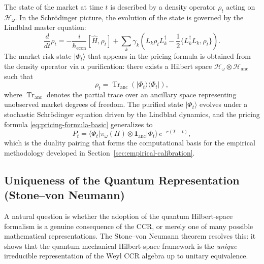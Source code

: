 The state of the market at time $t$ is described by a density operator $\rho_t$
acting on $\mathcal{H}_\omega$. In the Schr\"odinger picture, the evolution of the
state is governed by the Lindblad master equation:
\begin{equation}\label{eq:lindblad}
    \frac{d}{dt} \rho_t = -\frac{i}{\hbar_{\mathrm{econ}}} [\hat{H}, \rho_t]
    + \sum_k \gamma_k
    \left( L_k \rho_t L_k^\dagger - \frac{1}{2} \{L_k^\dagger L_k, \rho_t\} \right).
\end{equation}
The market risk state $|\Phi_t\rangle$ that appears in the pricing formula is
obtained from the density operator via a purification: there exists a Hilbert space
$\mathcal{H}_\omega \otimes \mathcal{H}_{\mathrm{anc}}$ such that
\begin{equation*}
    \rho_t = \operatorname{Tr}_{\mathrm{anc}}\!\left(|\Phi_t\rangle \langle \Phi_t|\right),
\end{equation*}
where $\operatorname{Tr}_{\mathrm{anc}}$ denotes the partial trace over an ancillary
space representing unobserved market degrees of freedom. The purified state
$|\Phi_t\rangle$ evolves under a stochastic Schr\"odinger equation driven by the
Lindblad dynamics, and the pricing formula \eqref{eq:pricing-formula-basic}
generalizes to
\begin{equation*}
    P_t = \langle \Phi_t | \pi_\omega(H) \otimes \mathbf{1}_{\mathrm{anc}} | \Phi_t \rangle
    \, e^{-r(T-t)},
\end{equation*}
which is the duality pairing that forms the computational basis for the empirical
methodology developed in Section~\ref{sec:empirical-calibration}.

\subsection{Uniqueness of the Quantum Representation (Stone--von Neumann)}
\label{sec:stone-vn-uniqueness}

A natural question is whether the adoption of the quantum Hilbert-space formalism
is a genuine consequence of the CCR, or merely one of many possible mathematical
representations. The Stone--von Neumann theorem resolves this: it shows that the
quantum mechanical Hilbert-space framework is the \emph{unique} irreducible
representation of the Weyl CCR algebra up to unitary equivalence.

